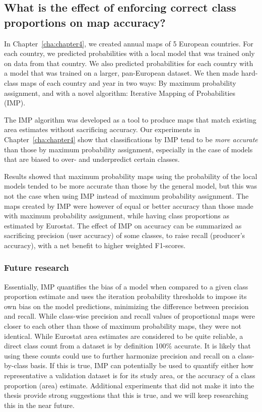             
    \subsection{What is the effect of enforcing correct class proportions on map accuracy?}
    \label{syn:rq4}
 
        In Chapter\@~\ref{cha:chapter4}, we created annual maps of 5 European countries. For each country, we predicted probabilities with a local model that was trained only on data from that country. We also predicted probabilities for each country with a model that was trained on a larger, pan-European dataset. We then made hard-class maps of each country and year in two ways: By maximum probability assignment, and with a novel algorithm: Iterative Mapping of Probabilities (IMP).
        
        The IMP algorithm was developed as a tool to produce maps that match existing area estimates without sacrificing accuracy. Our experiments in Chapter\@~\ref{cha:chapter4} show that classifications by IMP tend to be \textit{more accurate} than those by maximum probability assignment, especially in the case of models that are biased to over- and underpredict certain classes. 
        
        Results showed that maximum probability maps using the probability of the local models tended to be more accurate than those by the general model, but this was not the case when using IMP instead of maximum probability assignment. The maps created by IMP were however of equal or better accuracy than those made with maximum probability assignment, while having class proportions as estimated by Eurostat. The effect of IMP on accuracy  can be summarized as sacrificing precision (user accuracy) of some classes, to raise recall (producer's accuracy), with a net benefit to higher weighted F1-scores.

        \subsubsection{Future research}
        
        Essentially, IMP quantifies the bias of a model when compared to a given class proportion estimate and uses the iteration probability thresholds to impose its own bias on the model predictions, minimizing the difference between precision and recall.
        While class-wise precision and recall values of proportional maps were closer to each other than those of maximum probability maps, they were not identical. While Eurostat area estimates are considered to be quite reliable, a direct class count from a dataset is by definition 100\% accurate. It is likely that using these counts could use to further harmonize precision and recall on a class-by-class basis. If this is true, IMP can potentially be used to quantify either how representative a validation dataset is for its study area, or the accuracy of a class proportion (area) estimate. Additional experiments that did not make it into the thesis provide strong suggestions that this is true, and we will keep researching this in the near future.
        
